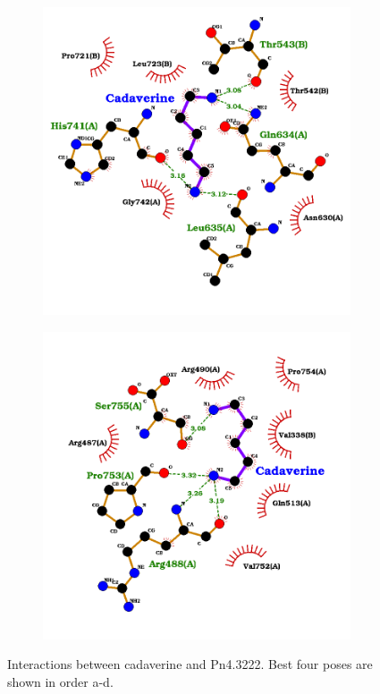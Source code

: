 \documentclass[12pt]{article}
\begin{document}
\begin{figure}[h!]
\begin{subfigure}[h!]{0.35\textwidth}
			\caption{}
		\end{subfigure}
		\hfill
		\begin{subfigure}[h!]{0.35\textwidth}
			\hspace{2cm}
			\includegraphics[width=\textwidth]{../8/Dock/best3.png}
			\caption{}
		\end{subfigure}
		\hfill
		\begin{subfigure}[h!]{0.35\textwidth}
			\hspace{-2cm}
			\includegraphics[width=\textwidth]{../8/Dock/best4.png}
			\caption{}
		\end{subfigure}
		\hfill
		\caption[Interactions between cadaverine and Pn4.3222]{\centering Interactions between cadaverine and Pn4.3222. Best four poses are shown in order a-d.}
		\label{fig8_3}
	\end{figure}
\end{document}
